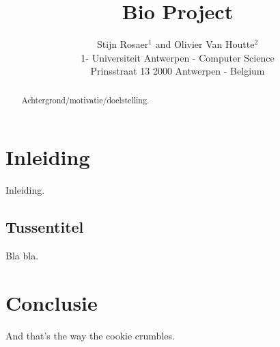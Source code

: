 \documentclass{esannV2}
\begin{document}
\title{Bio Project}

\author{Stijn Rosaer$^1$ and Olivier Van Houtte$^2$
\vspace{.3cm}\\
1- Universiteit Antwerpen - Computer Science \\
Prinsstraat 13 2000 Antwerpen - Belgium
}
\maketitle

\begin{abstract}
Achtergrond/motivatie/doelstelling.
\end{abstract}

\section{Inleiding}
Inleiding.

\subsection{Tussentitel}
Bla bla.

\section{Conclusie}

And that's the way the cookie crumbles.


\begin{footnotesize}

\begin{thebibliography}{99}

\end{thebibliography}

\end{footnotesize}
\end{document}
